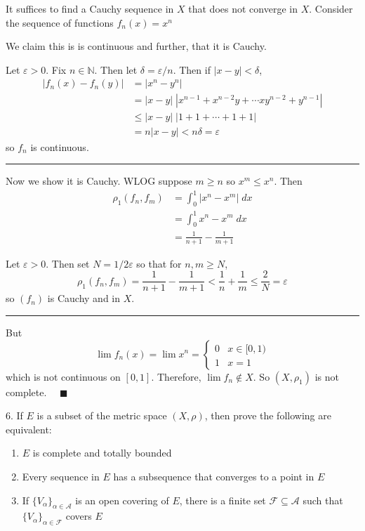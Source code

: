 \documentclass[12pt]{article}
\newcommand{\N}{\mathbb{N}}
\newcommand{\qed}{\quad \blacksquare}
\newcommand{\abs}[1]{\left\vert #1 \right\vert}
\newcommand{\ep}{\varepsilon}
\newcommand{\sub}{\subseteq}
\renewcommand{\div}{\vspace*{10pt}\hrule \vspace*{10pt}}
\begin{document}
\begin{itemize}
        \color{blue}
            It suffices to find a Cauchy sequence in $X$ that does not converge in $X$. Consider the sequence of functions $f_n(x) = x^n$

            We claim this is is continuous and further, that it is Cauchy. 

            Let $\ep > 0$. Fix $n \in \N$. Then let $\delta = \ep/n$. Then if $\abs{x - y} < \delta$,
            \begin{align*}
                \abs{f_n(x) - f_n(y)} &= \abs{x^n - y^n}\\ 
                &= \abs{x - y}\; \abs{x^{n-1} + x^{n-2}y + \cdots xy^{n-2} + y^{n-1}}\\
                &\leq \abs{x - y}\; \abs{1 + 1 + \cdots + 1 + 1}\\ 
                &= n\abs{x - y} < n\delta = \ep
            \end{align*}
            so $f_n$ is continuous.

            \div

            Now we show it is Cauchy. WLOG suppose $m \geq n$ so $x^m \leq x^n$. Then 
            \begin{align*}
                \rho_1(f_n, f_m) &= \int_0^1 \abs{x^n - x^m} \; dx \\
                &= \int_0^1 x^n - x^m \; dx \\
                &= \frac{1}{n+1} - \frac{1}{m+1}
            \end{align*}

            Let $\ep > 0$. Then set $N = 1/2\ep$ so that for $n, m \geq N$,
            \[\rho_1(f_n, f_m) = \frac{1}{n+1} - \frac{1}{m+1} < \frac{1}{n} + \frac{1}{m} \leq \frac{2}{N} = \ep\]
            so $(f_n)$ is Cauchy and in $X$. 

            \div  

            But 
            \[\lim f_n(x) = \lim x^n = \begin{cases}
                0 & x \in [0, 1) \\
                1 & x = 1
            \end{cases}\] 
            which is not continuous on $[0, 1]$. Therefore, $\lim f_n \notin X$. So $(X, \rho_1)$ is not complete. $\qed$
        \color{black}
\end{itemize}

\pagebreak

6. If $E$ is a subset of the metric space $(X, \rho)$, then prove the following are equivalent:
\begin{enumerate}[label=(\alph*)]
    \item $E$ is complete and totally bounded 
    \item Every sequence in $E$ has a subsequence that converges to a point in $E$
    \item If $\{V_{\alpha}\}_{\alpha \in \mathcal A}$ is an open covering of $E$, there is a finite set $\mathcal F \sub \mathcal A$ such that $\{V_{\alpha}\}_{\alpha \in \mathcal F}$ covers $E$ 
\end{enumerate}
\end{document}
